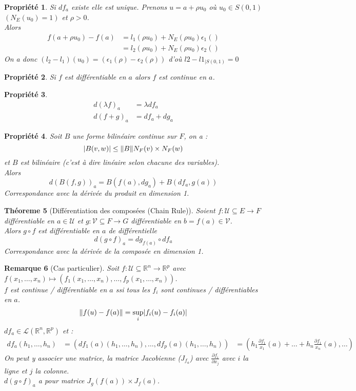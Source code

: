 \documentclass[a4paper, oneside]{report}
\theoremstyle{break}
\newtheorem{thm}{Théoreme}[section] %
\newtheorem{propr}[thm]{Propriété}
\newtheorem{remar}[thm]{Remarque}
\newcommand{\x}{\times}
\newcommand{\R}{\mathbb{R}}
\newcommand{\U}{\mathcal{U}}
\renewcommand{\L}{\mathcal{L}}
\newcommand{\displayastyle}{\displaystyle}
\DeclarePairedDelimiter\abs{\lvert}{\rvert}%
\DeclarePairedDelimiter\norm{\lVert}{\rVert}%
\begin{document}
\begin{propr}
Si $df_a$ existe elle est unique. Prenons $u=a+\rho u_0$ où $u_0\in S(0,1)$ $(N_E(u_0)=1)$ et $\rho > 0$.\\
Alors 
\begin{align*}
f(a+\rho u_0)-f(a)&=l_1(\rho u_0)+N_E(\rho u_0)\epsilon_1()\\
&=l_2(\rho u_0)+N_E(\rho u_0)\epsilon_2()
\end{align*}
On a donc $(l_2-l_1)(u_0)=(\epsilon_1(\rho)-\epsilon_2(\rho))$ d'où $l2-l1_{| S(0,1)}=0$
\end{propr}

\begin{propr}
Si $f$ est différentiable en $a$ alors $f$ est continue en $a$.
\end{propr}

\begin{propr}
\begin{align*}
d(\lambda f)_a&=\lambda d f_a\\
d (f+g)_a &=d f_a + d g_a
\end{align*}
\end{propr}

\begin{propr}
Soit $B$ une forme bilinéaire continue sur $F$, on a :
$$\abs{B(v,w)}\leq \norm{B}N_F(v)\x N_F(w)$$
et $B$ est bilinéaire (c'est à dire linéaire selon chacune des variables).\\
Alors
$$d (B(f,g))_a = B(f(a),d g_a)+ B(d f_a, g(a))$$
Correspondance avec la dérivée du produit en dimension 1.
\end{propr}

\begin{thm}[Différentiation des composées (Chain Rule)]
Soient $f:\U \subseteq E \rightarrow F$ différentiable en $a\in \U$ et $g:\mathcal{V} \subseteq F \rightarrow G$ différentiable en $b=f(a)\in \mathcal{V}$.\\
Alors $g\circ f$ est différentiable en $a$ de différentielle 
$$d(g\circ f)_a = d g_{f(a)}\circ d f_a$$
Correspondance avec la dérivée de la composée en dimension 1.
\end{thm}

\begin{remar}[Cas particulier]
Soit $f:\U\subseteq \R^n \rightarrow \R^p$ avec $f(x_1,\ldots, x_n)\mapsto (f_1(x_1,\ldots, x_n),\ldots, f_p(x_1,\ldots, x_n))$.\\
$f$ est continue / différentiable en $a$ ssi tous les $f_i$ sont continues / différentiables en $a$.
$$\norm{f(u)-f(a)} = \sup_i \abs{f_i(u)-f_i(a)}$$
$d f_a \in \L(\R^n, \R^p)$ et :
\begin{align*}
d f_a (h_1,\ldots, h_n)&=(d f_1(a) (h_1,\ldots, h_n),\ldots, d f_p(a) (h_1,\ldots, h_n))
&=(h_1\frac{\partial f_1}{x_1}(a)+\ldots + h_n\frac{\partial f_1}{x_n}(a), \ldots)
\end{align*}
On peut y associer une matrice, la matrice Jacobienne ($J_{f_a}$) avec $\displayastyle\frac{\partial f_i}{\partial x_j}$ avec $i$ la ligne et $j$ la colonne.\\
$d(g\circ f)_a$ a pour matrice $J_g(f(a)) \x J_f(a)$.
\end{remar}
\end{document}
